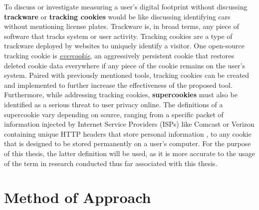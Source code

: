\documentclass[11pt]{article}
\begin{document}
To discuss or investigate measuring a user's digital footprint without discussing {\bf trackware} or {\bf tracking cookies} would be like discussing identifying cars without mentioning license plates. Trackware is, in broad terms, any piece of software that tracks system or user activity. Tracking cookies are a type of trackware deployed by websites to uniquely identify a visitor. One open-source tracking cookie is \href{https://samy.pl/evercookie/}{\it evercookie}, an aggressively persistent cookie that restores deleted cookie data everywhere if any piece of the cookie remains on the user's system\cite{evercookie}. Paired with previously mentioned tools, tracking cookies can be created and implemented to further increase the effectiveness of the proposed tool. Furthermore, while addressing tracking cookies, {\bf supercookies} must also be identified as a serious threat to user privacy online. The definitions of a supercookie vary depending on source, ranging from a specific packet of information injected by Internet Service Providers (ISPs) like Comcast or Verizon containing unique HTTP headers that store personal information \cite{supercookie-definition}, to any cookie that is designed to be stored permanently on a user's computer. For the purpose of this thesis, the latter definition will be used, as it is more accurate to the usage of the term in research conducted thus far associated with this thesis.

\vspace*{-.2in}
\section{Method of Approach}
\label{sec:method}
\vspace*{-.1in}

\end{document}
